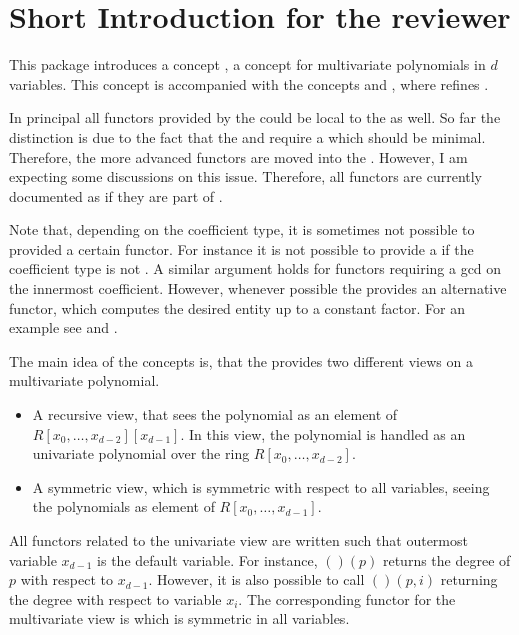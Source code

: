 


\section{Short Introduction for the reviewer}

This package introduces a concept , a concept for multivariate 
polynomials in $d$ variables. 
This concept is accompanied with the concepts  and 
, where  refines 
. 

In principal all functors provided by the  could 
be local to the  as well. 
So far the distinction is due to the fact that the  
and 
require a  which should be minimal. Therefore, the more 
advanced functors are moved into the .
However, I am expecting some discussions on this issue. Therefore, all functors are 
currently documented as if they are part of .

Note that, depending on the coefficient type,  
it is sometimes not possible to provided a certain functor. 
For instance it is not possible to provide  a  if the coefficient type
is not . A similar argument holds for functors requiring  
a gcd on the innermost coefficient. However, whenever possible the 
 provides an alternative functor, which computes the 
desired entity up to a constant factor. For an example see 
 and .

The main idea of the concepts is, that the  provides two 
different views on a multivariate polynomial. 

\begin{itemize}
\item 
A recursive view, that sees the polynomial as an element of 
$R[x_0,\dots,x_{d-2}][x_{d-1}]$. In this view, the polynomial is handled as
an univariate polynomial over the ring $R[x_0,\dots,x_{d-2}]$. 
\item 
A symmetric view, which is symmetric with respect to all variables,
seeing the polynomials as element of $R[x_0,\dots,x_{d-1}]$.
\end{itemize}

All functors related to the univariate view are written such that 
outermost variable $x_{d-1}$ is the default variable. For instance, 
$()(p)$ returns the degree of $p$ with respect to $x_{d-1}$. 
However, it is also possible to call 
$()(p,i)$ returning the 
degree with respect to variable $x_{i}$. The corresponding functor for the 
multivariate view is  which is 
symmetric in all variables. 